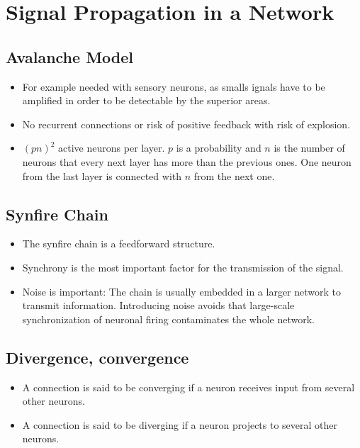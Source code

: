 \documentclass[main]{subfiles}
\begin{document}
\section{Signal Propagation in a Network}
\subsection{Avalanche Model}
\begin{itemize}[noitemsep,nolistsep]
	\item For example needed with sensory neurons, as smalls ignals have to be amplified in order to be detectable by the superior areas.
	\item No recurrent connections or risk of positive feedback with risk of explosion.
	\item $(pn)^2$ active neurons per layer. $p$ is a probability and $n$ is the number of neurons that every next layer has more than the previous ones. One neuron from the last layer is connected with $n$ from the next one.
\end{itemize}

\subsection{Synfire Chain}
\begin{itemize}[noitemsep,nolistsep]
	\item The synfire chain is a feedforward structure.
	\item Synchrony is the most important factor for the transmission of the signal.
	\item Noise is important: The chain is usually embedded in a larger network to transmit information. Introducing noise avoids that large-scale synchronization of neuronal firing contaminates the whole network.
\end{itemize}

\subsection{Divergence, convergence}
\begin{itemize}[noitemsep,nolistsep]
	\item A connection is said to be converging if a neuron receives input from several other neurons.
	\item A connection is said to be diverging if a neuron projects to several other neurons.
\end{itemize}
\end{document}
